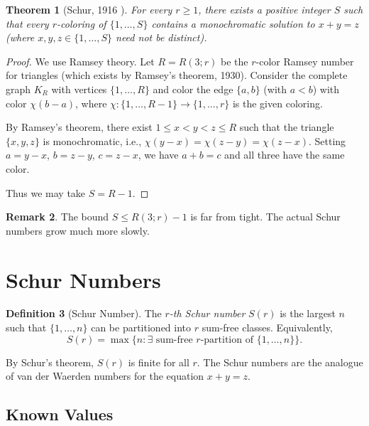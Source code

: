 \documentclass[12pt,a4paper]{amsart}
\newtheorem{theorem}{Theorem}[section]
\theoremstyle{definition}
\newtheorem{definition}[theorem]{Definition}
\newtheorem{remark}[theorem]{Remark}
\begin{document}
\begin{theorem}[Schur, 1916 \cite{Schur1916}]\label{thm:schur}
For every $r \geq 1$, there exists a positive integer $S$ such that every
$r$-coloring of $\{1, \ldots, S\}$ contains a monochromatic solution to
$x + y = z$ (where $x, y, z \in \{1, \ldots, S\}$ need not be distinct).
\end{theorem}

\begin{proof}
We use Ramsey theory. Let $R = R(3; r)$ be the $r$-color Ramsey number for
triangles (which exists by Ramsey's theorem, 1930). Consider the complete graph
$K_R$ with vertices $\{1, \ldots, R\}$ and color the edge $\{a, b\}$ (with $a < b$)
with color $\chi(b - a)$, where $\chi: \{1,\ldots, R-1\} \to \{1,\ldots,r\}$ is
the given coloring.

By Ramsey's theorem, there exist $1 \leq x < y < z \leq R$ such that the triangle
$\{x, y, z\}$ is monochromatic, i.e., $\chi(y-x) = \chi(z-y) = \chi(z-x)$.
Setting $a = y-x$, $b = z-y$, $c = z-x$, we have $a + b = c$ and all three have
the same color.

Thus we may take $S = R - 1$.
\end{proof}

\begin{remark}
The bound $S \leq R(3; r) - 1$ is far from tight. The actual Schur numbers grow
much more slowly.
\end{remark}

\section{Schur Numbers}\label{sec:schur-numbers}

\begin{definition}[Schur Number]
The \emph{$r$-th Schur number} $S(r)$ is the largest $n$ such that $\{1, \ldots, n\}$
can be partitioned into $r$ sum-free classes. Equivalently,
\[
  S(r) = \max\bigl\{n : \exists \text{ sum-free $r$-partition of } \{1,\ldots,n\}\bigr\}.
\]
\end{definition}

By Schur's theorem, $S(r)$ is finite for all $r$. The Schur numbers are the
analogue of van der Waerden numbers for the equation $x + y = z$.

\subsection{Known Values}
\end{document}
